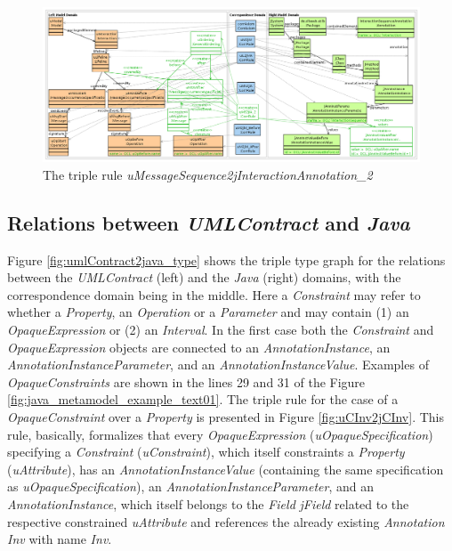 \documentclass[tuberlin,cic,tc,english,noabntcite]{iiufrgs}
\begin{document}
\begin{figure}[H]
    \caption{The triple rule \emph{uMessageSequence2jInteractionAnnotation\_2}}
    \begin{center}
        \includegraphics[width=.9\textwidth]{uMessageSequence2jInteractionAnnotation_2}
    \end{center}
    \label{fig:uMessageSequence2jInteractionAnnotation_2}
\end{figure}


\subsection{Relations between \emph{UMLContract} and \emph{Java}}
\label{subsec:UmlContracts2Java}

Figure \ref{fig:umlContract2java_type} shows the triple type graph for the relations between the \emph{UMLContract} (left) and the \emph{Java} (right) domains, with the correspondence domain being in the middle. Here a \emph{Constraint} may refer to whether a \emph{Property}, an \emph{Operation} or a \emph{Parameter} and may contain (1) an \emph{OpaqueExpression} or (2) an \emph{Interval}. In the first case both the \emph{Constraint} and \emph{OpaqueExpression} objects are connected to an \emph{AnnotationInstance}, an \emph{AnnotationInstanceParameter}, and an \emph{AnnotationInstanceValue}. Examples of \emph{OpaqueConstraints} are shown in the lines 29 and 31 of the Figure \ref{fig:java_metamodel_example_text01}. The triple rule for the case of a \emph{OpaqueConstraint} over a \emph{Property} is presented in Figure \ref{fig:uCInv2jCInv}. This rule, basically, formalizes that every \emph{OpaqueExpression} (\emph{uOpaqueSpecification}) specifying a \emph{Constraint} (\emph{uConstraint}), which itself constraints a \emph{Property} (\emph{uAttribute}), has an \emph{AnnotationInstanceValue} (containing the same specification as \emph{uOpaqueSpecification}), an \emph{AnnotationInstanceParameter}, and an \emph{AnnotationInstance}, which itself belongs to the \emph{Field} \emph{jField} related to the respective constrained \emph{uAttribute} and references the already existing \emph{Annotation} \emph{Inv} with name \emph{Inv}.
\end{document}
